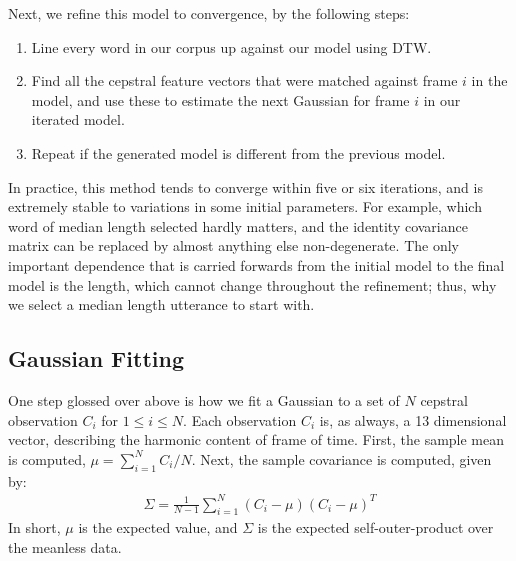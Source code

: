 \documentclass{article}
\begin{document}
Next, we refine this model to convergence, by the following steps:
\begin{enumerate}
\item Line every word in our corpus up against our model using DTW.
\item Find all the cepstral feature vectors that were matched against frame $i$ in the model, and use these to estimate the next Gaussian for frame $i$ in our iterated model.
\item Repeat if the generated model is different from the previous model.
\end{enumerate}
In practice, this method tends to converge within five or six iterations, and is extremely stable to variations in some initial parameters.
For example, which word of median length selected hardly matters, and the identity covariance matrix can be replaced by almost anything else non-degenerate.
The only important dependence that is carried forwards from the initial model to the final model is the length, which cannot change throughout the refinement; thus, why we select a median length utterance to start with.

\subsection{Gaussian Fitting}
One step glossed over above is how we fit a Gaussian to a set of $N$ cepstral observation $C_i$ for $1 \le i \le N$.
Each observation $C_i$ is, as always, a 13 dimensional vector, describing the harmonic content of frame of time.
First, the sample mean is computed, $\mu = \sum_{i=1}^N C_i / N$.
Next, the sample covariance is computed, given by:
\begin{align*}
\Sigma = \frac1{N-1} \sum_{i=1}^N (C_i - \mu) (C_i - \mu)^T
\end{align*}
In short, $\mu$ is the expected value, and $\Sigma$ is the expected self-outer-product over the meanless data.
\end{document}
